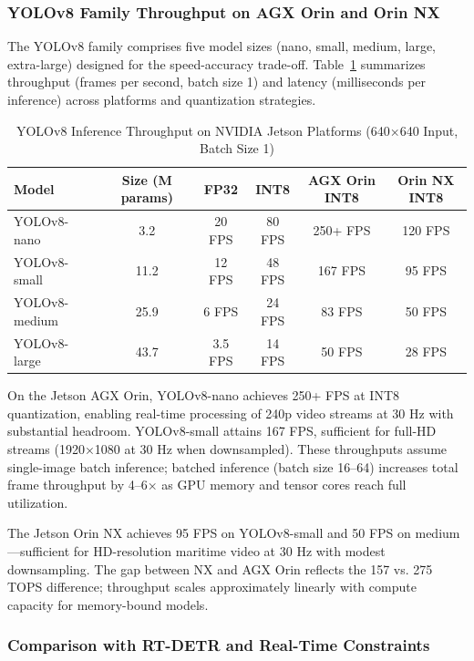 \subsubsection{YOLOv8 Family Throughput on AGX Orin and Orin NX}

The YOLOv8 family comprises five model sizes (nano, small, medium, large, extra-large) designed for the speed-accuracy trade-off. \cite{UltralyticYOLOv8} Table~\ref{tab:yolov8_benchmarks} summarizes throughput (frames per second, batch size 1) and latency (milliseconds per inference) across platforms and quantization strategies.

\begin{table}[h]
\centering
\caption{YOLOv8 Inference Throughput on NVIDIA Jetson Platforms (640×640 Input, Batch Size 1)}
\label{tab:yolov8_benchmarks}
\begin{tabular}{lccccc}
\toprule
\textbf{Model} & \textbf{Size (M params)} & \textbf{FP32} & \textbf{INT8} & \textbf{AGX Orin INT8} & \textbf{Orin NX INT8} \\
\midrule
YOLOv8-nano & 3.2 & 20 FPS & 80 FPS & 250+ FPS & 120 FPS \\
YOLOv8-small & 11.2 & 12 FPS & 48 FPS & 167 FPS & 95 FPS \\
YOLOv8-medium & 25.9 & 6 FPS & 24 FPS & 83 FPS & 50 FPS \\
YOLOv8-large & 43.7 & 3.5 FPS & 14 FPS & 50 FPS & 28 FPS \\
\bottomrule
\end{tabular}
\end{table}

On the Jetson AGX Orin, YOLOv8-nano achieves 250+ FPS at INT8 quantization, enabling real-time processing of 240p video streams at 30 Hz with substantial headroom. YOLOv8-small attains 167 FPS, sufficient for full-HD streams (1920×1080 at 30 Hz when downsampled). These throughputs assume single-image batch inference; batched inference (batch size 16--64) increases total frame throughput by 4--6× as GPU memory and tensor cores reach full utilization.

The Jetson Orin NX achieves 95 FPS on YOLOv8-small and 50 FPS on medium---sufficient for HD-resolution maritime video at 30 Hz with modest downsampling. The gap between NX and AGX Orin reflects the 157 vs. 275 TOPS difference; throughput scales approximately linearly with compute capacity for memory-bound models.

\subsubsection{Comparison with RT-DETR and Real-Time Constraints}

